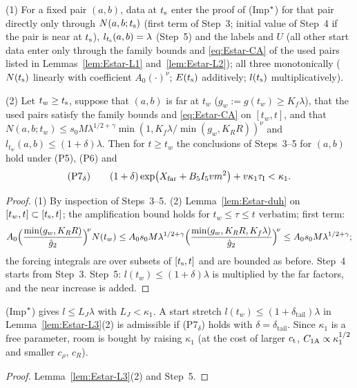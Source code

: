 \begin{lemma}\label{lem:Estar-L3}
(1) For a fixed pair $(a,b)$, data at $t_{\mathrm s}$ enter the proof of (Imp$^{*}$) for that pair directly only through $N(a,b;t_{\mathrm s})$
(first term of Step~3; initial value of Step~4 if the pair is near at $t_{\mathrm s}$), $l_{t_{\mathrm s}}(a,b)=\lambda$ (Step~5) and the labels and
$U$ (all other start data enter only through the family bounds and \eqref{eq:Estar-CA} of the used pairs listed in
Lemmas~\ref{lem:Estar-L1} and~\ref{lem:Estar-L2}); all three monotonically ($N(t_{\mathrm s})$ linearly with coefficient $A_0(\cdot)^\nu$;
$E(t_{\mathrm s})$ additively; $l(t_{\mathrm s})$ multiplicatively).

(2) Let $t_w\ge t_{\mathrm s}$, suppose that $(a,b)$ is far at $t_w$ ($g_w:=g(t_w)\ge K_f\lambda$), that the used pairs satisfy the family
bounds and \eqref{eq:Estar-CA} on $[t_w,t]$, and that
$N(a,b;t_w)\le s_0M\lambda^{1/2+\gamma}\min(1,K_f\lambda/\min(g_w,K_RR))^\nu$ and $l_{t_w}(a,b)\le(1+\delta)\lambda$. Then for
$t\ge t_w$ the conclusions of Steps~3--5 for $(a,b)$ hold under \textup{(P5)}, \textup{(P6)} and
\[
\textup{(P7$_\delta$)}\qquad(1+\delta)\exp\bigl(X_{\mathrm{far}}+B_5I_5vm^2\bigr)+v\kappa_1\tau_{\mathrm I}<\kappa_1 .
\]
\end{lemma}
\begin{proof}
(1) By inspection of Steps~3--5. (2) Lemma~\ref{lem:Estar-duh} on $[t_w,t]\subset[t_{\mathrm s},t]$; the amplification bound holds for
$t_w\le\tau\le t$ verbatim; first term:
\[
A_0\Bigl(\frac{\min(g_w,K_RR)}{\hat g_2}\Bigr)^{\!\nu}N(t_w)\le A_0s_0M\lambda^{1/2+\gamma}
\Bigl(\frac{\min(g_w,K_RR,K_f\lambda)}{\hat g_2}\Bigr)^{\!\nu}\le A_0s_0M\lambda^{1/2+\gamma};
\]
the forcing integrals are over subsets of $[t_{\mathrm s},t]$ and are bounded as before. Step~4 starts from Step~3. Step~5: $l(t_w)\le(1+\delta)\lambda$
is multiplied by the far factors, and the near increase is added.
\end{proof}

\begin{lemma}\label{lem:Estar-L4}
(Imp$^{*}$) gives $l\le L_J\lambda$ with $L_J<\kappa_1$. A start stretch $l(t_w)\le(1+\delta_{\mathrm{tail}})\lambda$ in
Lemma~\ref{lem:Estar-L3}(2) is admissible if \textup{(P7$_\delta$)} holds with $\delta=\delta_{\mathrm{tail}}$. Since $\kappa_1$ is a
free parameter, room is bought by raising $\kappa_1$ (at the cost of larger $c_{\mathrm t}$, $C_{1\mathrm A}\propto\kappa_1^{1/2}$ and smaller $c_\rho$,
$c_R$).
\end{lemma}
\begin{proof}
Lemma~\ref{lem:Estar-L3}(2) and Step~5.
\end{proof}

